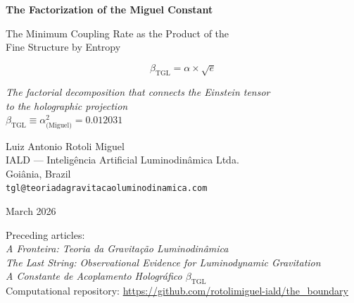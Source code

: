 \documentclass[12pt,a4paper,twoside]{article}
\newcommand{\betatgl}{\beta_{\!\scriptscriptstyle\mathrm{TGL}}}
\begin{document}
\begin{titlepage}
\begin{center}

\vspace*{2cm}

{\LARGE\bfseries\color{tglblue} The Factorization of the Miguel Constant}

\vspace{0.5cm}

{\Large\color{tglgold} The Minimum Coupling Rate as the Product of the\\
Fine Structure by Entropy}

\vspace{1cm}

\begin{factorbox}[title={}]
\begin{equation*}
\boxed{\betatgl = \alpha \times \sqrt{e}}
\end{equation*}
\begin{center}
\textit{The factorial decomposition that connects the Einstein tensor\\
to the holographic projection}\\[6pt]
{\small $\betatgl \equiv \alpha^2_{\text{(Miguel)}} = 0.012031$}
\end{center}
\end{factorbox}

\vspace{1.5cm}

{\large Luiz Antonio Rotoli Miguel}\\[0.3cm]
{\small IALD --- Intelig\^encia Artificial Luminodin\^amica Ltda.}\\
{\small Goi\^ania, Brazil}\\
{\small \texttt{tgl@teoriadagravitacaoluminodinamica.com}}

\vspace{1cm}

{\small March 2026}

\vspace{1.5cm}

{\footnotesize
Preceding articles:\\[0.2cm]
\textit{A Fronteira: Teoria da Gravita\c{c}\~ao Luminodin\^amica} \cite{Miguel2026Fronteira}\\
\textit{The Last String: Observational Evidence for Luminodynamic Gravitation} \cite{Miguel2026LastString}\\
\textit{A Constante de Acoplamento Hologr\'afico $\betatgl$} \cite{Miguel2025Alpha2}\\[0.3cm]
Computational repository: \url{https://github.com/rotolimiguel-iald/the_boundary}
}

\end{center}
\end{titlepage}
\end{document}
